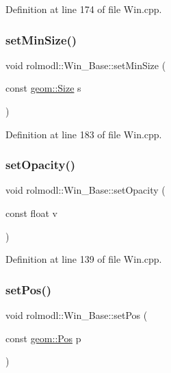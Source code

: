 Definition at line 174 of file Win.\+cpp.

\mbox{\label{classrolmodl_1_1_win___base_a9a8e417ba5b7f943305eba48dc591a4b}} 
\subsubsection{\texorpdfstring{setMinSize()}{setMinSize()}}
{\footnotesize\ttfamily void rolmodl\+::\+Win\+\_\+\+Base\+::set\+Min\+Size (\begin{DoxyParamCaption}\item[{const \mbox{\hyperlink{structrolmodl_1_1geom_1_1_size}{geom\+::\+Size}}}]{s }\end{DoxyParamCaption})\hspace{0.3cm}{\ttfamily [noexcept]}}



Definition at line 183 of file Win.\+cpp.

\mbox{\label{classrolmodl_1_1_win___base_a2058f1eed4ad2348c45033ec0ff3c68d}} 
\subsubsection{\texorpdfstring{setOpacity()}{setOpacity()}}
{\footnotesize\ttfamily void rolmodl\+::\+Win\+\_\+\+Base\+::set\+Opacity (\begin{DoxyParamCaption}\item[{const float}]{v }\end{DoxyParamCaption})}



Definition at line 139 of file Win.\+cpp.

\mbox{\label{classrolmodl_1_1_win___base_a157c6195fb7dd41b6e5535777b5b7046}} 
\subsubsection{\texorpdfstring{setPos()}{setPos()}}
{\footnotesize\ttfamily void rolmodl\+::\+Win\+\_\+\+Base\+::set\+Pos (\begin{DoxyParamCaption}\item[{const \mbox{\hyperlink{structrolmodl_1_1geom_1_1_pos}{geom\+::\+Pos}}}]{p }\end{DoxyParamCaption})\hspace{0.3cm}{\ttfamily [noexcept]}}



